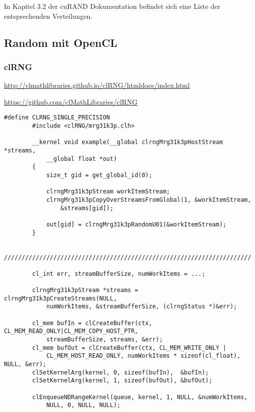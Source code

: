             In Kapitel 3.2 der cuRAND Dokumentation befindet sich eine Liste der entsprechenden Verteilungen. \autocite{curandDoc}					
						
        \subsection{Random mit OpenCL}
            \subsubsection{clRNG}
            \url{http://clmathlibraries.github.io/clRNG/htmldocs/index.html}
			
            \url{https://github.com/clMathLibraries/clRNG}			
            \begin{lstlisting}[caption=clRNG Beispiel]
        #define CLRNG_SINGLE_PRECISION                                  
        #include <clRNG/mrg31k3p.clh>                                  
                                                                
        __kernel void example(__global clrngMrg31k3pHostStream *streams, 
            __global float *out)
        {                                                               
            size_t gid = get_global_id(0);                                 
                                                                      
            clrngMrg31k3pStream workItemStream;                          
            clrngMrg31k3pCopyOverStreamsFromGlobal(1, &workItemStream, 
                &streams[gid]); 
                                                                   
            out[gid] = clrngMrg31k3pRandomU01(&workItemStream);       
        }                                                                                                                               
    
        //////////////////////////////////////////////////////////////////////
			
        cl_int err, streamBufferSize, numWorkItems = ...;

        clrngMrg31k3pStream *streams = clrngMrg31k3pCreateStreams(NULL, 
            numWorkItems, &streamBufferSize, (clrngStatus *)&err);

        cl_mem bufIn = clCreateBuffer(ctx, CL_MEM_READ_ONLY|CL_MEM_COPY_HOST_PTR, 
            streamBufferSize, streams, &err);
        cl_mem bufOut = clCreateBuffer(ctx, CL_MEM_WRITE_ONLY | 
            CL_MEM_HOST_READ_ONLY, numWorkItems * sizeof(cl_float), NULL, &err);
        clSetKernelArg(kernel, 0, sizeof(bufIn),  &bufIn);
        clSetKernelArg(kernel, 1, sizeof(bufOut), &bufOut);

        clEnqueueNDRangeKernel(queue, kernel, 1, NULL, &numWorkItems, 
            NULL, 0, NULL, NULL);
            \end{lstlisting}
			
